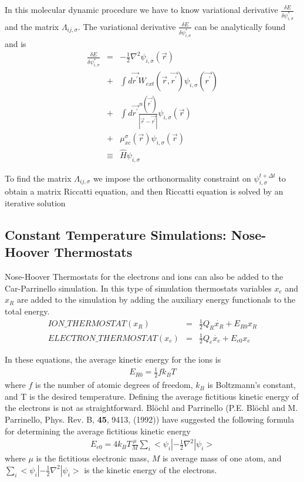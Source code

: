 In this molecular dynamic procedure we have to know variational derivative
$\frac{\delta E}{\delta \psi_{i,\sigma}^{*}}$ and the matrix 
$\Lambda_{ij,\sigma}$. 
The variational derivative $\frac{\delta E}{\delta \psi_{i,\sigma}^{*}}$ 
can be analytically found and is
\begin{eqnarray}
\frac{\delta E}{\delta \psi_{i,\sigma}^{*}} 
      &=&  -\frac{1}{2} \nabla^2 
            \psi_{i,\sigma}(\vec{r}) \nonumber \\
      &+& \int d\vec{r^{\prime}} 
           W_{ext}(\vec{r},\vec{r^{\prime}}) 
          \psi_{i,\sigma}(\vec{r^{\prime}}) \nonumber \\
      &+& \int d\vec{r^{\prime}} 
                    \frac{n(\vec{r^{\prime}})}{|\vec{r}-\vec{r^{\prime}}|}
          \psi_{i,\sigma}(\vec{r}) \nonumber \\
      &+& \mu_{xc}^{\sigma}(\vec{r}) 
          \psi_{i,\sigma}(\vec{r}) \nonumber \\
& \equiv & \hat{H} \psi_{i,\sigma}
\label{eq:b8}
\end{eqnarray}
                        
\noindent
To find the matrix $\Lambda_{ij,\sigma}$ we impose the orthonormality
constraint on $\psi_{i,\sigma}^{t+\Delta t}$ to obtain a
matrix Riccatti equation, and then Riccatti equation is solved by an iterative
solution 


\subsection{Constant Temperature Simulations: Nose-Hoover Thermostats}
\label{sec:pspw_nose}

Nose-Hoover Thermostats for the electrons and ions can also be added to the 
Car-Parrinello simulation.  In this type of simulation thermostats variables $x_e$ and $x_R$ 
are added to the simulation by adding the auxiliary energy functionals to the total energy.
\begin{eqnarray}
ION\_THERMOSTAT(x_R)      &=&  \frac{1}{2} Q_R \dot{x_R} + E_{R0}x_R \\ 
ELECTRON\_THERMOSTAT(x_e) &=&  \frac{1}{2} Q_e \dot{x_e} + E_{e0}x_e 
\end{eqnarray}

In these equations, the average kinetic energy for the ions is
\begin{eqnarray}
E_{R0} = \frac{1}{2} f k_B T
\end{eqnarray}
where $f$ is the number of atomic degrees of freedom, $k_B$ is 
Boltzmann's constant, and T is the desired temperature.  Defining
the average fictitious kinetic energy of the electrons is not as straightforward.
Bl\"{o}chl and Parrinello 
(P.E. Bl\"{o}chl and M. Parrinello, Phys. Rev. B, \textbf{45}, 9413, (1992)) 
have suggested the following formula for determining
the average fictitious kinetic energy
\begin{eqnarray}
E_{e0} = 4 k_B T \frac{\mu}{M} \sum_i <\psi_i|-\frac{1}{2} \nabla^2 |\psi_i>
\end{eqnarray}
where $\mu$ is the fictitious electronic mass, $M$ is average mass of one atom,
and $\sum_i <\psi_i|-\frac{1}{2} \nabla^2 |\psi_i>$ is the kinetic energy of the
electrons.

